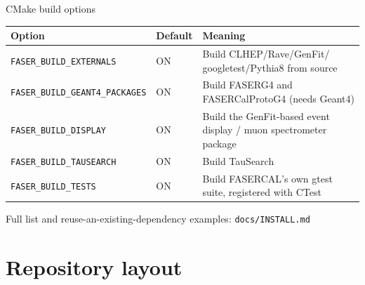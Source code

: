 \documentclass[aspectratio=169]{beamer}
\begin{document}
\begin{frame}{CMake build options}
  \centering
  \scriptsize
  \begin{tabular}{@{}p{3.6cm}p{1.1cm}p{6.3cm}@{}}
    \toprule
    \textbf{Option} & \textbf{Default} & \textbf{Meaning} \\
    \midrule
    \texttt{FASER\_BUILD\_EXTERNALS} & ON & Build CLHEP/Rave/GenFit/
      googletest/Pythia8 from source \\
    \texttt{FASER\_BUILD\_GEANT4\_PACKAGES} & ON & Build FASERG4 and
      FASERCalProtoG4 (needs Geant4) \\
    \texttt{FASER\_BUILD\_DISPLAY} & ON & Build the GenFit-based event
      display / muon spectrometer package \\
    \texttt{FASER\_BUILD\_TAUSEARCH} & ON & Build TauSearch \\
    \texttt{FASER\_BUILD\_TESTS} & ON & Build FASERCAL's own gtest suite,
      registered with CTest \\
    \bottomrule
  \end{tabular}
  \par\medskip
  \footnotesize Full list and reuse-an-existing-dependency examples:
  \texttt{docs/INSTALL.md}
\end{frame}

\section{Repository layout}
\end{document}
